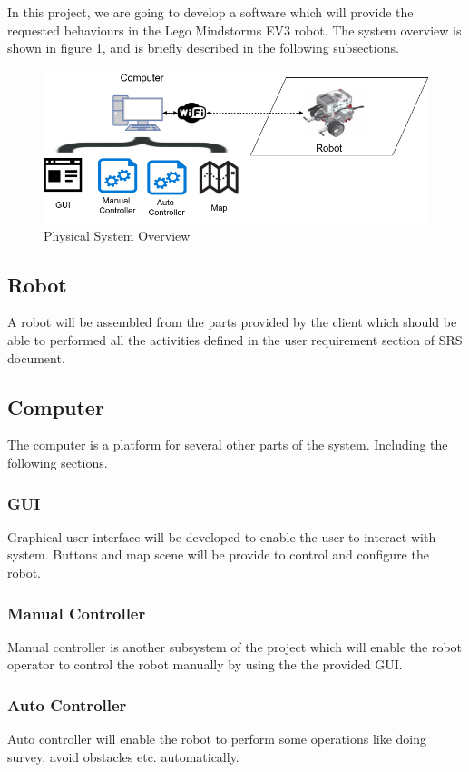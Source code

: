 In this project, we are going to develop a software which will provide the requested behaviours in the Lego Mindstorms EV3 robot. The system overview is shown in figure \ref{fig:robotSystem}, and is briefly described in the following subsections.

\begin{figure}[H]
	\centering
	\includegraphics[width=\textwidth]{Robot_system.png}
	\caption{\label{fig:robotSystem} Physical System Overview}
\end{figure}

\subsection{Robot}
A robot will be assembled from the parts provided by the client which should be able to performed all the activities defined in the user requirement section of SRS document. 
\subsection{Computer}
The computer is a platform for several other parts of the system. Including the following sections.

\subsubsection{GUI}
Graphical user interface will be developed to enable the user to interact with system. Buttons and map scene will be provide to control and configure the robot.  
\subsubsection{Manual Controller}
Manual controller is another subsystem of the project which will enable the robot operator to control the robot manually by using the the provided GUI. 
\subsubsection{Auto Controller}
Auto controller will enable the robot to perform some operations like doing survey, avoid obstacles etc. automatically. 
